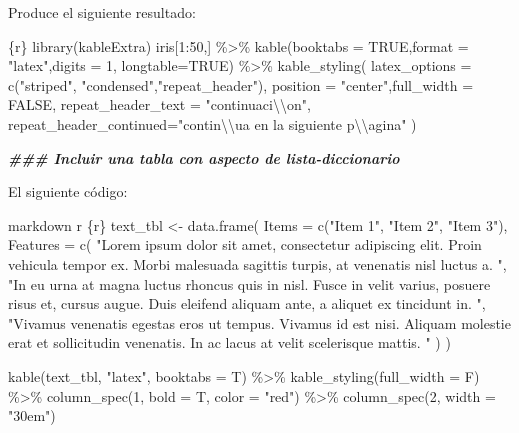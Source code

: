 \documentclass[11pt,a4paper,oneside,]{article}
\newenvironment{Shaded}{\begin{snugshade}}{\end{snugshade}}
\newcommand{\AttributeTok}[1]{\textcolor[rgb]{0.77,0.63,0.00}{#1}}
\newcommand{\DocumentationTok}[1]{\textcolor[rgb]{0.56,0.35,0.01}{\textbf{\textit{#1}}}}
\newcommand{\NormalTok}[1]{#1}
\newcommand{\SpecialCharTok}[1]{\textcolor[rgb]{0.00,0.00,0.00}{#1}}
\newcommand{\StringTok}[1]{\textcolor[rgb]{0.31,0.60,0.02}{#1}}
\numberwithin{dummy}{section}
\theoremstyle{ocrenumbox}
\theoremstyle{blacknumex}
\theoremstyle{blacknumbox}
\theoremstyle{ocrenum}
\theoremstyle{ocrenum}
\begin{document}
\begin{Shaded}
\begin{Highlighting}[numbers=left,,]
\NormalTok{Produce el siguiente resultado}\SpecialCharTok{:}

\StringTok{\textasciigrave{}\textasciigrave{}\textasciigrave{}}\AttributeTok{\{r\}}
\AttributeTok{library(kableExtra) }
\AttributeTok{iris[1:50,] \%\textgreater{}\% }
\AttributeTok{  kable(booktabs = TRUE,format = "latex",digits = 1, longtable=TRUE) \%\textgreater{}\%}
\AttributeTok{  kable\_styling(}
\AttributeTok{   latex\_options = c("striped", "condensed","repeat\_header"), }
\AttributeTok{   position = "center",full\_width = FALSE,}
\AttributeTok{   repeat\_header\_text = "continuaci}\SpecialCharTok{\textbackslash{}\textbackslash{}}\AttributeTok{\textquotesingle{}on", }
\AttributeTok{   repeat\_header\_continued="contin}\SpecialCharTok{\textbackslash{}\textbackslash{}}\AttributeTok{\textquotesingle{}ua en la siguiente p}\SpecialCharTok{\textbackslash{}\textbackslash{}}\AttributeTok{\textquotesingle{}agina"}
\AttributeTok{  )}
\StringTok{\textasciigrave{}\textasciigrave{}\textasciigrave{}}


\DocumentationTok{\#\#\# Incluir una tabla con aspecto de lista{-}diccionario}

\NormalTok{El siguiente código}\SpecialCharTok{:}

\StringTok{\textasciigrave{}\textasciigrave{}\textasciigrave{}\textasciigrave{}}\NormalTok{markdown}
\StringTok{\textasciigrave{}}\AttributeTok{r \textquotesingle{}\textquotesingle{}}\StringTok{\textasciigrave{}\textasciigrave{}\textasciigrave{}\textasciigrave{}}\AttributeTok{\{r\}}
\AttributeTok{text\_tbl \textless{}{-} data.frame(}
\AttributeTok{  Items = c("Item 1", "Item 2", "Item 3"), }
\AttributeTok{  Features = c(}
\AttributeTok{    "Lorem ipsum dolor sit amet, consectetur adipiscing elit.}
\AttributeTok{    Proin vehicula tempor ex. Morbi malesuada sagittis turpis,}
\AttributeTok{    at venenatis nisl luctus a. ",}
\AttributeTok{    "In eu urna at magna luctus rhoncus quis in nisl. Fusce in velit}
\AttributeTok{    varius, posuere risus et, cursus augue. Duis eleifend aliquam ante,}
\AttributeTok{    a aliquet ex tincidunt in. ",}
\AttributeTok{    "Vivamus venenatis egestas eros ut tempus. Vivamus id est nisi.}
\AttributeTok{    Aliquam molestie erat et sollicitudin venenatis. In ac lacus at}
\AttributeTok{    velit scelerisque mattis. "}
\AttributeTok{    ) }
\AttributeTok{  )}

\AttributeTok{kable(text\_tbl, "latex", booktabs = T) \%\textgreater{}\% }
\AttributeTok{  kable\_styling(full\_width = F) \%\textgreater{}\% }
\AttributeTok{  column\_spec(1, bold = T, color = "red") \%\textgreater{}\% }
\AttributeTok{  column\_spec(2, width = "30em")}
\StringTok{\textasciigrave{}\textasciigrave{}\textasciigrave{}}


\end{Highlighting}
\end{Shaded}
\end{document}
